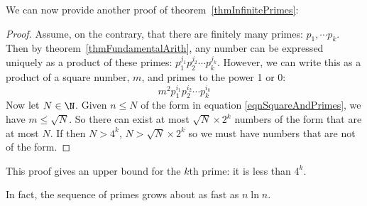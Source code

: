 \documentclass[../Main.tex]{subfiles}
\begin{document}
We can now provide another proof of theorem~\ref{thmInfinitePrimes}:
\begin{proof}
    Assume, on the contrary, that there are finitely many primes: $p_1, \cdots p_k$. Then by theorem~\ref{thmFundamentalArith}, any number can be expressed uniquely as a product of these primes: $p_1^{j_1} p_2^{j_2} \cdots p_k^{j_k}$. However, we can write this as a product of a square number, $m$, and primes to the power 1 or 0:
    \begin{equation}
        m^2 p_1^{i_1} p_2^{i_2} \cdots p_k^{i_k}
        \label{eqnSquareAndPrimes}
    \end{equation}
    Now let $N \in \N$. Given $n \leq N$ of the form in equation \ref{eqnSquareAndPrimes}, we have $m \leq \sqrt{N}$. So there can exist at most $\sqrt{N} \times 2^k$ numbers of the form that are at most $N$. If then $N > 4^k$, $N > \sqrt{N} \times 2^k$ so we must have numbers that are not of the form. \contradiction
\end{proof}
\begin{remarks}
    \item This proof gives an upper bound for the $k$th prime: it is less than $4^k$.
    \item In fact, the sequence of primes grows about as fast as $n \ln{n}$.
\end{remarks}
\end{document}
